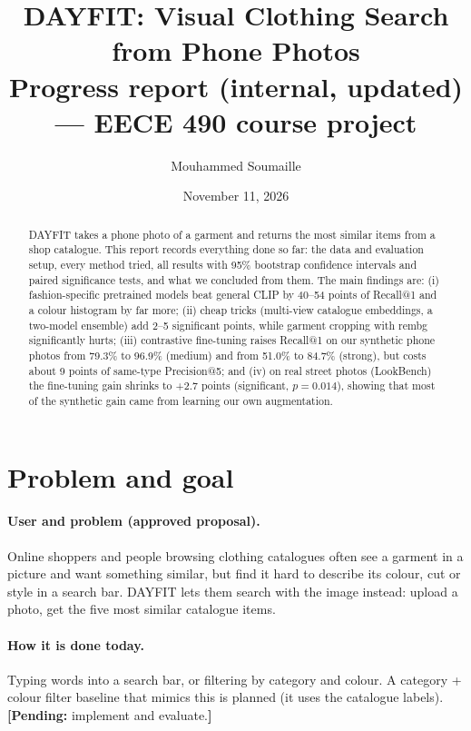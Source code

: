 \documentclass[11pt,a4paper]{article}
\title{DAYFIT: Visual Clothing Search from Phone Photos\\[4pt]
\large Progress report (internal, updated) --- EECE 490 course project}
\author{Mouhammed Soumaille}
\date{November 11, 2026}
\newcommand{\pending}[1]{\textcolor{orange!80!black}{\textbf{[Pending:} #1\textbf{]}}}
\begin{document}
\maketitle

\begin{abstract}
DAYFIT takes a phone photo of a garment and returns the most similar items from a shop catalogue.
This report records everything done so far: the data and evaluation setup, every method tried,
all results with 95\% bootstrap confidence intervals and paired significance tests, and what we
concluded from them. The main findings are: (i) fashion-specific pretrained models beat general CLIP
by 40--54 points of Recall@1 and a colour histogram by far more; (ii) cheap tricks (multi-view catalogue
embeddings, a two-model ensemble) add 2--5 significant points, while garment cropping with rembg
significantly hurts; (iii) contrastive fine-tuning raises Recall@1 on our synthetic phone photos from
79.3\% to 96.9\% (medium) and from 51.0\% to 84.7\% (strong), but costs about 9 points of same-type
Precision@5; and (iv) on real street photos (LookBench) the fine-tuning gain shrinks to +2.7 points
(significant, $p=0.014$), showing that most of the synthetic gain came from learning our own augmentation.
\end{abstract}

\setcounter{tocdepth}{1}
\tableofcontents
\newpage

\section{Problem and goal}

\paragraph{User and problem (approved proposal).} Online shoppers and people browsing clothing catalogues
often see a garment in a picture and want something similar, but find it hard to describe its colour, cut or
style in a search bar. DAYFIT lets them search with the image instead: upload a photo, get the five most
similar catalogue items.

\paragraph{How it is done today.} Typing words into a search bar, or filtering by category and colour. A
category + colour filter baseline that mimics this is planned (it uses the catalogue labels).
\pending{implement and evaluate.}
\end{document}
